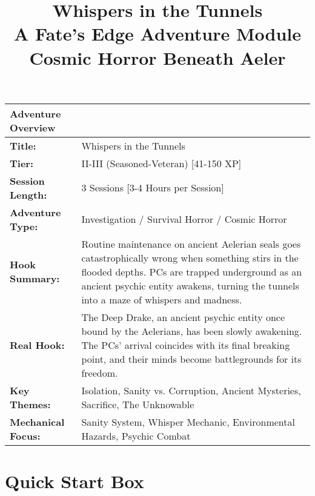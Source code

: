 \documentclass[11pt]{article}
\title{\Huge\textbf{Whispers in the Tunnels}\\
\Large A Fate's Edge Adventure Module\\
\large Cosmic Horror Beneath Aeler}
\author{}
\date{}
\begin{document}
\maketitle

\begin{center}
\begin{tabular}{|p{2.5cm}|p{12cm}|}
\hline
\textbf{Adventure Overview} & \\
\hline
\textbf{Title:} & Whispers in the Tunnels \\
\textbf{Tier:} & II-III (Seasoned-Veteran) [41-150 XP] \\
\textbf{Session Length:} & 3 Sessions [3-4 Hours per Session] \\
\textbf{Adventure Type:} & Investigation / Survival Horror / Cosmic Horror \\
\textbf{Hook Summary:} & Routine maintenance on ancient Aelerian seals goes catastrophically wrong when something stirs in the flooded depths. PCs are trapped underground as an ancient psychic entity awakens, turning the tunnels into a maze of whispers and madness. \\
\textbf{Real Hook:} & The Deep Drake, an ancient psychic entity once bound by the Aelerians, has been slowly awakening. The PCs' arrival coincides with its final breaking point, and their minds become battlegrounds for its freedom. \\
\textbf{Key Themes:} & Isolation, Sanity vs. Corruption, Ancient Mysteries, Sacrifice, The Unknowable \\
\textbf{Mechanical Focus:} & Sanity System, Whisper Mechanic, Environmental Hazards, Psychic Combat \\
\hline
\end{tabular}
\end{center}

\section{Quick Start Box}
\end{document}

